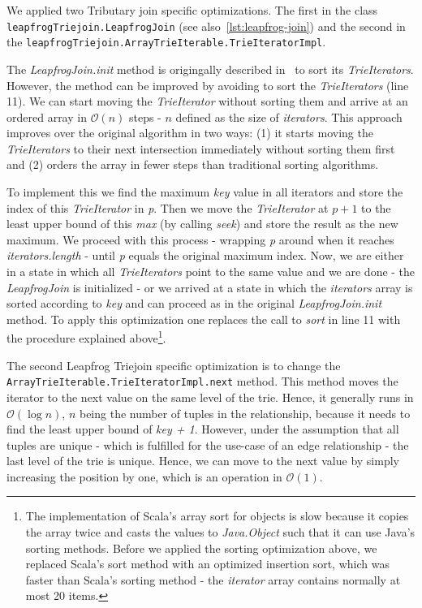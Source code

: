 We applied two Tributary join specific optimizations.
The first in the class \texttt{leapfrogTriejoin.LeapfrogJoin} (see also~\cref{lst:leapfrog-join}) and the second
in the \texttt{leapfrogTriejoin.ArrayTrieIterable.TrieIteratorImpl}.

The \textit{LeapfrogJoin.init} method is origingally described in~\cite{leapfrog} to sort its \textit{TrieIterators}.
However, the method can be improved by avoiding to sort the \textit{TrieIterators} (line 11).  %
We can start moving the \textit{TrieIterator} without sorting them and arrive at an ordered array in $\mathcal{O} (n)$ steps - $n$ defined as the size of \textit{iterators}.
This approach improves over the original algorithm in two ways: (1) it starts moving the \textit{TrieIterators} to their next intersection immediately without sorting them first and
(2) orders the array in fewer steps than traditional sorting algorithms.

To implement this we find the maximum \textit{key} value in all iterators and store the index of this \textit{TrieIterator} in \textit{p}.
Then we move the \textit{TrieIterator} at $p + 1$ to the least upper bound of this \textit{max} (by calling \textit{seek}) and store the result as the new maximum.
We proceed with this process - wrapping \textit{p} around when it reaches \textit{iterators.length} - until \textit{p} equals the original maximum index.
Now, we are either in a state in which all \textit{TrieIterators} point to the same value and we are done - the \textit{LeapfrogJoin} is initialized -
or we arrived at a state in which the \textit{iterators} array is sorted according to \textit{key} and can proceed as in the original \textit{LeapfrogJoin.init} method.
To apply this optimization one replaces the call to \textit{sort} in line 11 with the procedure explained above\footnote{The
implementation of Scala's array sort for objects is slow
because it copies the array twice and casts the values to \textit{Java.Object} such that it can use Java's sorting methods.
Before we applied the sorting optimization above, we replaced Scala's sort
method with an optimized insertion sort, which was faster than Scala's sorting method - the \textit{iterator} array contains normally at most 20 items.}.

The second Leapfrog Triejoin specific optimization is to change the \texttt{ArrayTrieIterable.TrieIteratorImpl.next} method.
This method moves the iterator to the next value on the same level of the trie.
Hence, it generally runs in $\mathcal{O} (\log n)$, $n$ being the number of tuples in the
relationship, because it needs to find the least upper bound of \textit{key + 1}.
However, under the assumption that all tuples are unique - which is fulfilled for the use-case of an edge relationship -
the last level of the trie is unique.
Hence, we can move to the next value by simply increasing the position by one, which is an operation in $\mathcal{O} (1)$.

